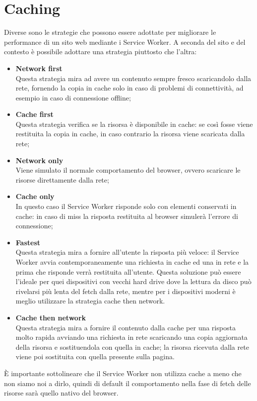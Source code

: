 \documentclass[11pt ,a4paper , twoside , openright ]{book}
\begin{document}
	\section{Caching}
	Diverse sono le strategie che possono essere adottate per migliorare le performance di un sito web mediante i Service Worker. A seconda del sito e del contesto è possibile adottare una strategia piuttosto che l’altra:
	\begin{itemize}
		\item \textbf{Network first} \\
		Questa strategia mira ad avere un contenuto sempre fresco scaricandolo dalla rete, fornendo la copia in cache solo in caso di problemi di connettività, ad esempio in caso di connessione offline;
		\item \textbf{Cache first} \\
		Questa strategia verifica se la risorsa è disponibile in cache: se così fosse viene restituita la copia in cache, in caso contrario la risorsa viene scaricata dalla rete;
		\item \textbf{Network only} \\
		Viene simulato il normale comportamento del browser, ovvero scaricare le risorse direttamente dalla rete;
		\item \textbf{Cache only} \\
		In questo caso il Service Worker risponde solo con elementi conservati in cache: in caso di miss la risposta restituita al browser simulerà l’errore di connessione;
		\item \textbf{Fastest} \\
		Questa strategia mira a fornire all’utente la risposta più veloce: il Service Worker avvia contemporaneamente una richiesta in cache ed una in rete e la prima che risponde verrà restituita all’utente.
		Questa soluzione può essere l’ideale per quei dispositivi con vecchi hard drive dove la lettura da disco può  rivelarsi più lenta del fetch dalla rete, mentre per i dispositivi moderni è meglio utilizzare la strategia cache then network.
		\item \textbf{Cache then network} \\
		Questa strategia mira a fornire il contenuto dalla cache per una risposta molto rapida avviando una richiesta in rete scaricando una copia aggiornata della risorsa e sostituendola con quella in cache; la risorsa ricevuta dalla rete viene poi sostituita con quella presente sulla pagina.
	\end{itemize}
	È importante sottolineare che il Service Worker non utilizza cache a meno che non siamo noi a dirlo, quindi di default il comportamento nella fase di fetch delle risorse sarà quello nativo del browser.
	
\end{document}
